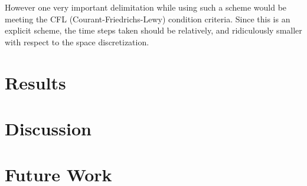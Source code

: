 \documentclass[a4paper,10pt]{IEEEtran}
\begin{document}
	However one very important delimitation while using such a scheme would be meeting the CFL (Courant-Friedrichs-Lewy) condition criteria. Since this is an explicit scheme, the time steps taken should be relatively, and ridiculously smaller with respect to the space discretization. 
	
	
	 
	
	\section{Results}
	
	\section{Discussion}
	\section{Future Work}
	
	
	\begin{thebibliography}{1}
		
	\end{thebibliography}
\end{document}
